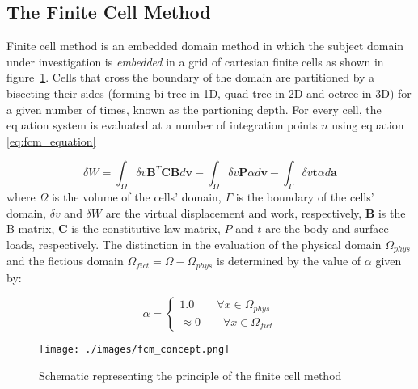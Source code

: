 \subsection{The Finite Cell Method}
\label{fcm_subsection}
Finite cell method is an embedded domain method in which the subject domain under investigation is \emph{embedded} in a grid of cartesian finite cells as shown in figure~\ref{fig:fcmConcept}. Cells that cross the boundary of the domain are partitioned by a bisecting their sides (forming bi-tree in 1D, quad-tree in 2D and octree in 3D) for a given number of times, known as the partioning depth. For every cell, the equation system is evaluated at a number of integration points $n$ using equation \ref{eq:fcm_equation}

\begin{equation}
\label{eq:fcm_equation}
\delta W = \int_{\Omega} \delta v \textbf{B}^T \textbf{C} \textbf{B} d\textbf{v}
	 - \int_{\Omega} \delta v \textbf{P} \alpha d\textbf{v}
	 - \int_{\Gamma} \delta v \textbf{t} \alpha d\textbf{a}
\end{equation}
where $\Omega$ is the volume of the cells' domain, $\Gamma$ is the boundary of the cells' domain, $\delta v$ and $\delta W$ are the virtual displacement and work, respectively, $\textbf{B}$ is the B matrix, $\textbf{C}$ is the constitutive law matrix, $P$ and $t$ are the body and surface loads, respectively. The distinction in the evaluation of the physical domain $\Omega_{phys}$ and the fictious domain $\Omega_{fict} = \Omega - \Omega_{phys}$ is determined by the value of $\alpha$ given by:

\begin{equation}
\label{eq:alpha_equation}
\alpha = 
\begin{cases}
    1.0 \qquad \forall x \in \Omega_{phys} \\
    \approx 0 \qquad \forall x \in \Omega_{fict}
\end{cases}
\end{equation}

\begin{figure}
  \begin{center}
    \texttt{[image: ./images/fcm\_concept.png]}
    \caption{Schematic representing the principle of the finite cell method}
    \label{fig:fcmConcept}
  \end{center}
\end{figure}